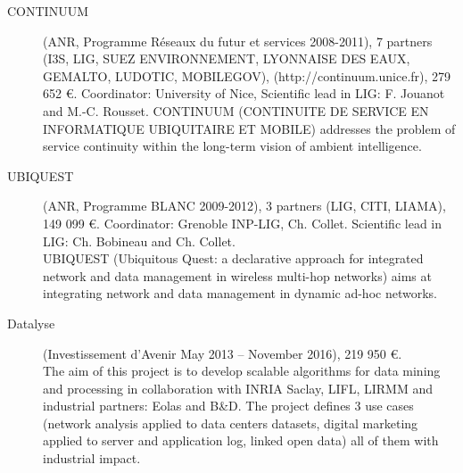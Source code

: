 \begin{description}
\item[CONTINUUM] (ANR, Programme R{\'e}seaux du futur et services 2008-2011),  7 partners (I3S, LIG, SUEZ ENVIRONNEMENT, LYONNAISE DES EAUX, GEMALTO, LUDOTIC, MOBILEGOV), (http://continuum.unice.fr), 279 652 \euro. Coordinator: University of Nice, Scientific lead in LIG: F. Jouanot and M.-C. Rousset. CONTINUUM (CONTINUITE DE SERVICE EN INFORMATIQUE UBIQUITAIRE ET MOBILE) addresses the problem of service continuity within the long-term vision of ambient intelligence. 

\item[UBIQUEST] (ANR, Programme BLANC 2009-2012), 3 partners (LIG, CITI, LIAMA), 149 099 \euro. Coordinator: Grenoble INP-LIG, Ch. Collet. Scientific lead in LIG: Ch. Bobineau and Ch. Collet. \\
UBIQUEST (Ubiquitous Quest: a declarative approach for integrated network and data management in wireless multi-hop networks) aims at integrating network and data management in dynamic ad-hoc networks. 

\item[Datalyse] (Investissement d'Avenir May 2013 -- November 2016), 219 950 \euro. \\
The aim of this project is to develop scalable algorithms for data mining and processing in collaboration with INRIA Saclay, LIFL, LIRMM and industrial partners: Eolas and B\&D. The project defines 3 use cases (network analysis applied to data centers datasets, digital marketing applied to server and application log, linked open data) all of them with industrial impact. 


\end{description}
